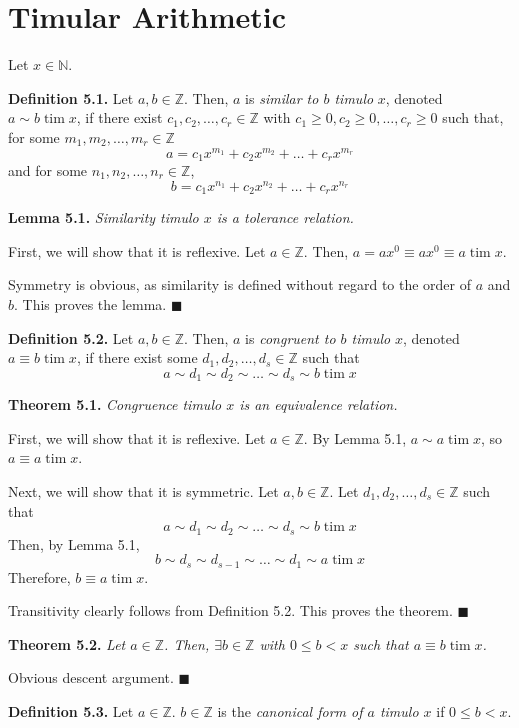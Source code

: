 \documentclass{article}
\newcommand{\tim}{\;\text{tim}\;}
\newcommand{\zee}{\mathbb{Z}}
\newcommand{\N}{\mathbb{N}}
\begin{document}
\setcounter{section}{4}
\section{Timular Arithmetic}

Let $x \in \N$.

\textbf{Definition 5.1.} Let $a, b \in \zee$.
Then, $a$ is \textit{similar to $b$ timulo} $x$,
denoted $a \sim b \tim x$,
if there exist $c_1, c_2, \ldots, c_r \in \zee$
with $c_1 \geq 0, c_2 \geq 0, \ldots, c_r \geq 0$
such that, for some $m_1, m_2, \ldots, m_r \in \zee$
\[a = c_1x^{m_1} + c_2x^{m_2} + \ldots + c_rx^{m_r}\]
and for some $n_1, n_2, \ldots, n_r \in \zee$,
\[b = c_1x^{n_1} + c_2x^{n_2} + \ldots + c_rx^{n_r}\]


\textbf{Lemma 5.1.} \textit{Similarity timulo $x$ is a
tolerance relation.}

First, we will show that it is reflexive. Let $a \in \zee$.
Then, $a = ax^0 \equiv ax^0 \equiv a \tim x$.

Symmetry is obvious, as similarity is defined without
regard to the order of $a$ and $b$. This proves the lemma.
$\blacksquare$


\textbf{Definition 5.2.} Let $a, b \in \zee$.
Then, $a$ is \textit{congruent to $b$ timulo} $x$, denoted
$a \equiv b \tim x$, if there exist some $d_1, d_2, \ldots, d_s \in \zee$
such that
\[a \sim d_1 \sim d_2 \sim \ldots \sim d_s \sim b \tim x\]

\textbf{Theorem 5.1.} \textit{Congruence timulo $x$ is an
equivalence relation.}

First, we will show that it is reflexive. Let $a \in \zee$.
By Lemma 5.1, $a \sim a \tim x$, so $a \equiv a \tim x$.

Next, we will show that it is symmetric. Let $a, b \in \zee$.
Let $d_1, d_2, \ldots, d_s \in \zee$ such that
\[a \sim d_1 \sim d_2 \sim \ldots \sim d_s \sim b \tim x\]
Then, by Lemma 5.1,
\[b \sim d_s \sim d_{s-1} \sim \ldots \sim d_1 \sim a \tim x\]
Therefore, $b \equiv a \tim x$.

Transitivity clearly follows from Definition 5.2. This proves the
theorem. $\blacksquare$

\textbf{Theorem 5.2.} \textit{Let $a \in \zee$.
Then, $\exists b \in \zee$ with $0 \leq b < x$
such that $a \equiv b \tim x$.}

Obvious descent argument. $\blacksquare$

\textbf{Definition 5.3.} Let $a \in \zee$.
$b \in \zee$ is the \textit{canonical form of $a$ timulo $x$}
if $0 \leq b < x$.
\end{document}
